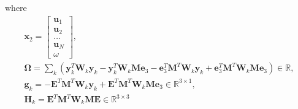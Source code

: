 \documentclass{article}
\newcommand{\mbf}[1]{\mathbf{#1}}
\newcommand{\bbm}{\begin{bmatrix}}
\newcommand{\ebm}{\end{bmatrix}}
\begin{document}
where
\begin{align}
    \mbf{x}_2 = \bbm \mbf{u}_1 \\ \mbf{u}_2 \\ \dots \\ \mbf{u}_N \\ \omega \ebm, \\
    \mbf{\Omega} = \sum_k \left( \mbf{y}_k^T \mbf{W}_k \mbf{y}_k - \mbf{y}_k^T \mbf{W}_k \mbf{M} \mbf{e}_3 - \mbf{e}_3^T \mbf{M}^T \mbf{W}_k \mbf{y}_k + \mbf{e}_3^T \mbf{M}^T \mbf{W}_k \mbf{M} \mbf{e}_3 \right) \in \mathbb{R}, \\
    \mbf{g}_k = -\mbf{E}^T\mbf{M}^T\mbf{W}_k\mbf{y}_k + \mbf{E}^T\mbf{M}^T\mbf{W}_k\mbf{M}\mbf{e}_3  \in \mathbb{R}^{3 \times 1}, \\
    \mbf{H}_k = \mbf{E}^T \mbf{M}^T \mbf{W}_k \mbf{M} \mbf{E} \in \mathbb{R}^{3 \times 3}
\end{align}
\end{document}
